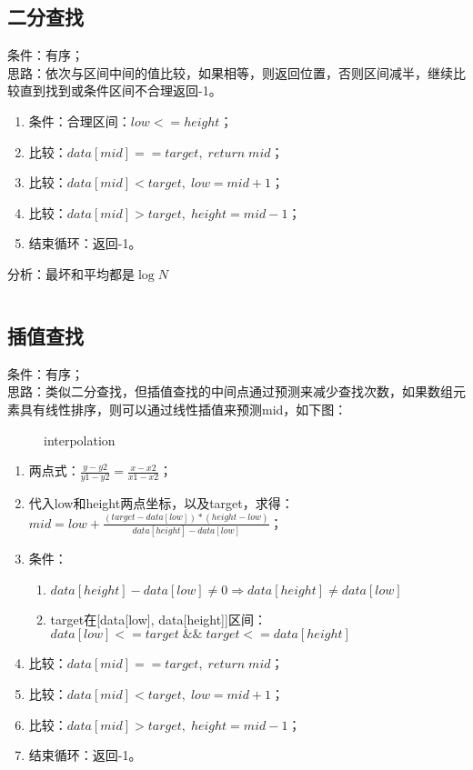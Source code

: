 \documentclass{article}
\begin{document}
    \subsection{二分查找}
      条件：有序；
      \\[10pt] 思路：依次与区间中间的值比较，如果相等，则返回位置，否则区间减半，继续比较直到找到或条件区间不合理返回-1。
      \begin{enumerate}
        \item 条件：合理区间：$low <= height$；
        \item 比较：$data[mid] ==  target, \; return \; mid$；
        \item 比较：$data[mid] < target, \; low = mid + 1$；
        \item 比较：$data[mid] > target, \; height = mid - 1$；
        \item 结束循环：返回-1。
      \end{enumerate}
      分析：最坏和平均都是$\log N$
      \inputminted{java}{src/chapter03/BinarySearch.java}
    \subsection{插值查找}
      条件：有序；
      \\[10pt] 思路：类似二分查找，但插值查找的中间点通过预测来减少查找次数，如果数组元素具有线性排序，则可以通过线性插值来预测mid，如下图：

      \begin{figure}
        \centering
          
          \caption{interpolation}
          \label{interpolation}
      \end{figure}

      \begin{enumerate}
        \item 两点式：$\frac{y - y2}{y1 - y2} = \frac{x - x2}{x1 - x2}$；
        \item 代入low和height两点坐标，以及target，求得：\newline $mid = low + \frac{(target - data[low]) * (height - low)}{data[height] - data[low]}$；
        \item 条件：
          \begin{enumerate}
            \item $data[height] - data[low] \neq 0 \Rightarrow data[height] \neq data[low]$
            \item target在[data[low], data[height]]区间：\newline $data[low] <= target \; \&\& \; target <= data[height]$
          \end{enumerate}
        \item 比较：$data[mid] ==  target, \; return \; mid$；
        \item 比较：$data[mid] < target, \; low = mid + 1$；
        \item 比较：$data[mid] > target, \; height = mid - 1$；
        \item 结束循环：返回-1。
      \end{enumerate}
\end{document}
